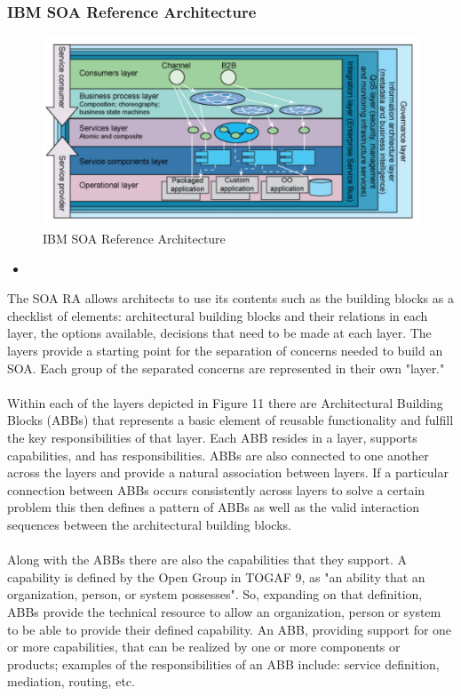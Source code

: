\documentclass[10pt,a4paper]{article}
\begin{document}
\subsubsection{IBM SOA Reference Architecture}
\begin{figure}[h!]
 \hfill \includegraphics[width=\linewidth]{images/ibm-soa}\hspace*{\fill}
  \caption{IBM SOA Reference Architecture}
  \label{fig:imb-soa}
\end{figure}
\begin{itemize}
	\item 
\end{itemize}
The SOA RA allows architects to use its contents such as the building blocks as a checklist of elements: architectural building blocks and their relations in each layer, the options available, decisions that need to be made at each layer. The layers provide a starting point for the separation of concerns needed to build an SOA. Each group of the separated concerns are represented in their own "layer." \\ \\
Within each of the layers depicted in Figure 11 there are Architectural Building Blocks (ABBs) that represents a basic element of reusable functionality and fulfill the key responsibilities of that layer. Each ABB resides in a layer, supports capabilities, and has responsibilities. ABBs are also connected to one another across the layers and provide a natural association between layers. If a particular connection between ABBs occurs consistently across layers to solve a certain problem this then defines a pattern of ABBs as well as the valid interaction sequences between the architectural building blocks. \\ \\
Along with the ABBs there are also the capabilities that they support. A capability is defined by the Open Group in TOGAF 9, as "an ability that an organization, person, or system possesses". So, expanding on that definition, ABBs provide the technical resource to allow an organization, person or system to be able to provide their defined capability. An ABB, providing support for one or more capabilities, that can be realized by one or more components or products; examples of the responsibilities of an ABB include: service definition, mediation, routing, etc.
\end{document}
